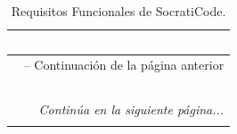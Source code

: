 \begingroup
\setlength{\arrayrulewidth}{1pt}
\begin{longtable}{|c|p{3.5cm}|p{9cm}|}
  \caption{Requisitos Funcionales de SocratiCode.}
  \label{TB:REQ_FUNC_SOCRATICODE} \\
  
  \hline
  \rowcolor{maincolor} 
  \textcolor{white}{\textbf{ID}} & \textcolor{white}{\textbf{Nombre}} & \textcolor{white}{\textbf{Descripción}} \\
  \hline
  \endfirsthead
  
  \multicolumn{3}{c}{{\tablename\ \thetable{} -- Continuación de la página anterior}} \\
  \hline
  \rowcolor{maincolor} 
  \textcolor{white}{\textbf{ID}} & \textcolor{white}{\textbf{Nombre}} & \textcolor{white}{\textbf{Descripción}} \\
  \hline
  \endhead
  
  \hline \multicolumn{3}{|r|}{\textit{Continúa en la siguiente página...}} \\ \hline
  \endfoot
  
  \hline
  \endlastfoot


\end{longtable}
